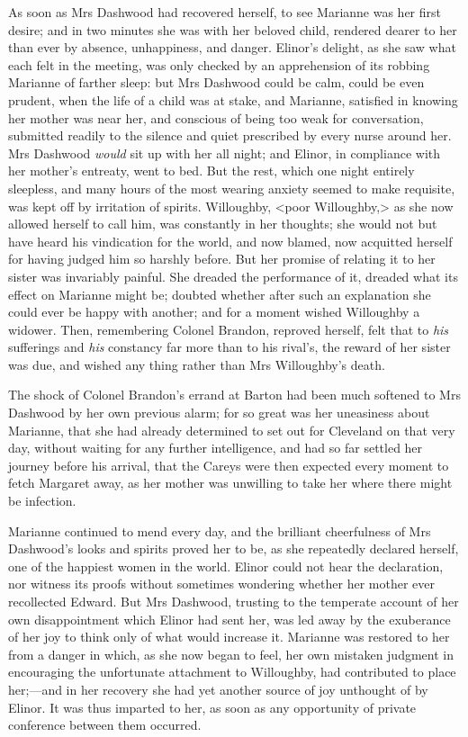 As soon as Mrs Dashwood had recovered herself, to see Marianne was her first desire; and in two minutes she was with her beloved child, rendered dearer to her than ever by absence, unhappiness, and danger. Elinor's delight, as she saw what each felt in the meeting, was only checked by an apprehension of its robbing Marianne of farther sleep: but Mrs Dashwood could be calm, could be even prudent, when the life of a child was at stake, and Marianne, satisfied in knowing her mother was near her, and conscious of being too weak for conversation, submitted readily to the silence and quiet prescribed by every nurse around her. Mrs Dashwood \textit{would} sit up with her all night; and Elinor, in compliance with her mother's entreaty, went to bed. But the rest, which one night entirely sleepless, and many hours of the most wearing anxiety seemed to make requisite, was kept off by irritation of spirits. Willoughby, <poor Willoughby,> as she now allowed herself to call him, was constantly in her thoughts; she would not but have heard his vindication for the world, and now blamed, now acquitted herself for having judged him so harshly before. But her promise of relating it to her sister was invariably painful. She dreaded the performance of it, dreaded what its effect on Marianne might be; doubted whether after such an explanation she could ever be happy with another; and for a moment wished Willoughby a widower. Then, remembering Colonel Brandon, reproved herself, felt that to \textit{his} sufferings and \textit{his} constancy far more than to his rival's, the reward of her sister was due, and wished any thing rather than Mrs Willoughby's death.

The shock of Colonel Brandon's errand at Barton had been much softened to Mrs Dashwood by her own previous alarm; for so great was her uneasiness about Marianne, that she had already determined to set out for Cleveland on that very day, without waiting for any further intelligence, and had so far settled her journey before his arrival, that the Careys were then expected every moment to fetch Margaret away, as her mother was unwilling to take her where there might be infection.

Marianne continued to mend every day, and the brilliant cheerfulness of Mrs Dashwood's looks and spirits proved her to be, as she repeatedly declared herself, one of the happiest women in the world. Elinor could not hear the declaration, nor witness its proofs without sometimes wondering whether her mother ever recollected Edward. But Mrs Dashwood, trusting to the temperate account of her own disappointment which Elinor had sent her, was led away by the exuberance of her joy to think only of what would increase it. Marianne was restored to her from a danger in which, as she now began to feel, her own mistaken judgment in encouraging the unfortunate attachment to Willoughby, had contributed to place her;—and in her recovery she had yet another source of joy unthought of by Elinor. It was thus imparted to her, as soon as any opportunity of private conference between them occurred.

